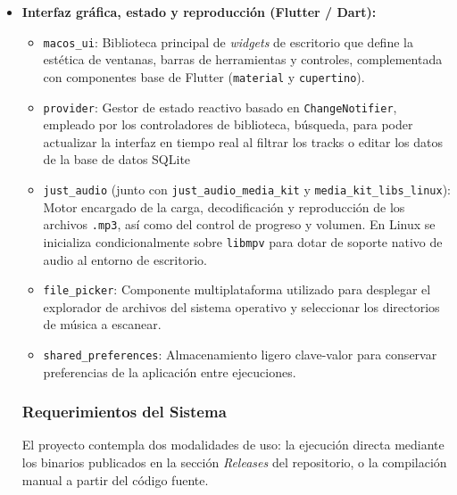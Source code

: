 \begin{itemize}
\item \textbf{Interfaz gráfica, estado y reproducción (Flutter / Dart):}
    \begin{itemize}
        \item \texttt{macos\_ui}: Biblioteca principal de \textit{widgets} de escritorio que define la estética de ventanas, barras de herramientas y controles, complementada con componentes base de Flutter (\texttt{material} y \texttt{cupertino}).\cite{pubdev_cupertinotabview}
        \item \texttt{provider}: Gestor de estado reactivo basado en \texttt{ChangeNotifier}, empleado por los controladores de biblioteca, búsqueda, para poder actualizar la interfaz en tiempo real al filtrar los tracks o editar los datos de la base de datos SQLite \cite{flutter_widget_previewer}
        \item \texttt{just\_audio} (junto con \texttt{just\_audio\_media\_kit} y \texttt{media\_kit\_libs\_linux}): Motor encargado de la carga, decodificación y reproducción de los archivos \texttt{.mp3}, así como del control de progreso y volumen. En Linux se inicializa condicionalmente sobre \texttt{libmpv} para dotar de soporte nativo de audio al entorno de escritorio.\cite{pubdev_file_picker,pubdev_macos_ui_package,pubdev_just_audio,pubdev_media_kit_libs_linux}
        \item \texttt{file\_picker}: Componente multiplataforma utilizado para desplegar el explorador de archivos del sistema operativo y seleccionar los directorios de música a escanear.\cite{pubdev_file_picker}
        \item \texttt{shared\_preferences}: Almacenamiento ligero clave-valor para conservar preferencias de la aplicación entre ejecuciones.
    \end{itemize}

\subsubsection{Requerimientos del Sistema}

El proyecto contempla dos modalidades de uso: la ejecución directa mediante los binarios publicados en la sección \textit{Releases} del repositorio, o la compilación manual a partir del código fuente.


\end{itemize}
